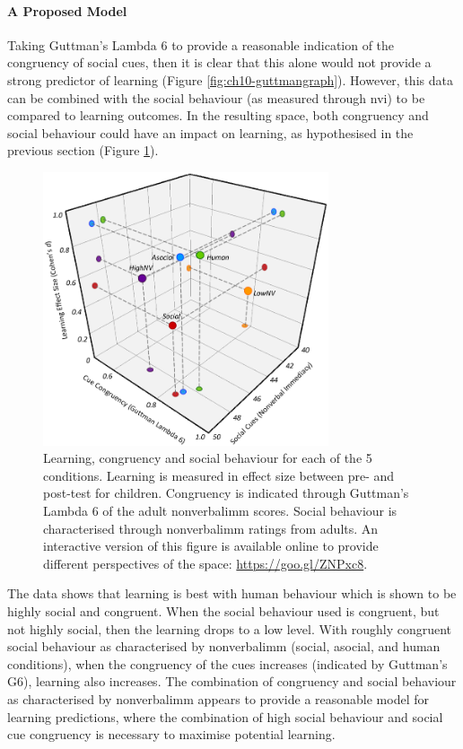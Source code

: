 \paragraph{A Proposed Model}
Taking Guttman's Lambda 6 to provide a reasonable indication of the congruency of social cues, then it is clear that this alone would not provide a strong predictor of \gls{learning} (Figure \ref{fig:ch10-guttmangraph}). However, this data can be combined with the social behaviour (as measured through \acrshort{nvi}) to be compared to \gls{learning} outcomes. In the resulting space, both congruency and social behaviour could have an impact on \gls{learning}, as hypothesised in the previous section (Figure \ref{fig:ch10-3dgraph}).

\begin{figure}[t]
    \centering
    \includegraphics[width=0.75\textwidth]{images/ch10_3dplot.png}
    \caption{Learning, congruency and social behaviour for each of the 5 conditions. Learning is measured in effect size between pre- and post-test for children. Congruency is indicated through Guttman's Lambda 6 of the adult \gls{nonverbalimm} scores. Social behaviour is characterised through \gls{nonverbalimm} ratings from adults. An interactive version of this figure is available online to provide different perspectives of the space: \url{https://goo.gl/ZNPxc8}.}
    \label{fig:ch10-3dgraph}
\end{figure}

The data shows that \gls{learning} is best with human behaviour which is shown to be highly social and congruent. When the social behaviour used is congruent, but not highly social, then the \gls{learning} drops to a low level. With roughly congruent social behaviour as characterised by \gls{nonverbalimm} (social, asocial, and human conditions), when the congruency of the cues increases (indicated by Guttman's G6), \gls{learning} also increases. The combination of congruency and social behaviour as characterised by \gls{nonverbalimm} appears to provide a reasonable model for \gls{learning} predictions, where the combination of high social behaviour and social cue congruency is necessary to maximise potential \gls{learning}.


